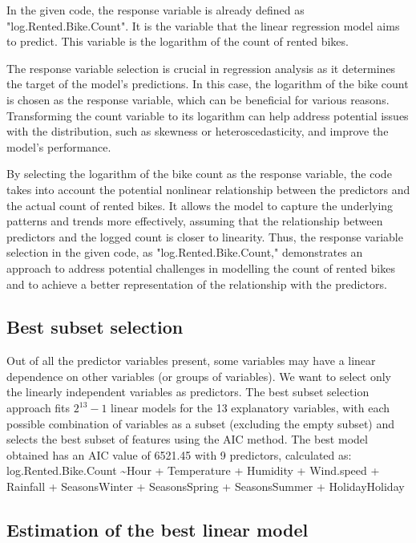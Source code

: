 \documentclass[12 pt]{scrartcl}
\begin{document}
In the given code, the response variable is already defined as "log.Rented.Bike.Count". It is the variable that the linear regression model aims to predict. This variable is the logarithm of the count of rented bikes.

The response variable selection is crucial in regression analysis as it determines the target of the model's predictions. In this case, the logarithm of the bike count is chosen as the response variable, which can be beneficial for various reasons. Transforming the count variable to its logarithm can help address potential issues with the distribution, such as skewness or heteroscedasticity, and improve the model's performance.

By selecting the logarithm of the bike count as the response variable, the code takes into account the potential nonlinear relationship between the predictors and the actual count of rented bikes. It allows the model to capture the underlying patterns and trends more effectively, assuming that the relationship between predictors and the logged count is closer to linearity. Thus, the response variable selection in the given code, as "log.Rented.Bike.Count," demonstrates an approach to address potential challenges in modelling the count of rented bikes and to achieve a better representation of the relationship with the predictors.


\subsection{Best subset selection}

Out of all the predictor variables present, some variables may have a linear dependence on other variables (or groups of variables). We want to select only the linearly independent variables as predictors. 
The best subset selection approach fits ${2^{13} − 1}$ linear models for the 13 explanatory variables, with each possible combination of variables as a subset (excluding the empty subset) and selects the best subset of features using the AIC method. 
The best model obtained has an AIC value of 6521.45 with 9 predictors, calculated as:
log.Rented.Bike.Count \textasciitilde Hour + Temperature + Humidity + Wind.speed + Rainfall + SeasonsWinter + SeasonsSpring + SeasonsSummer + HolidayHoliday

\subsection{Estimation of the best linear model}
\end{document}
